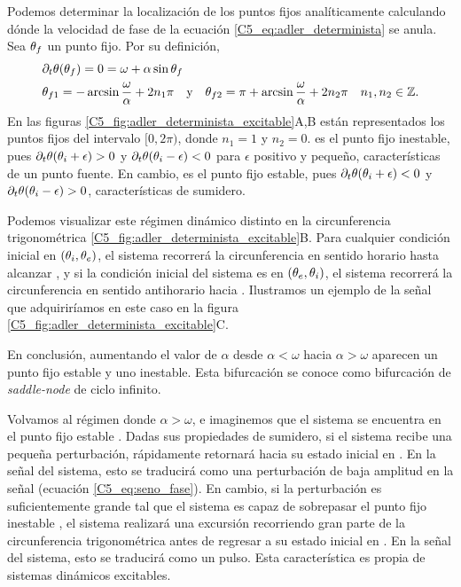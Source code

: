 \documentclass[./main.tex]{subfiles}
\begin{document}
Podemos determinar la localización de los puntos fijos analíticamente calculando dónde la velocidad de fase de la ecuación \ref{C5_eq:adler_determinista} se anula. Sea $\theta_f$ un punto fijo. Por su definición,  
\begin{align}
    &\partial_t \theta (\xx_f) = 0 = \omega + \alpha \sin{\xx_f}\\
    &\xx_{f1} = -\arcsin{\frac{\omega}{\alpha}} + 2 n_1 \pi \quad \text{y} \quad
     \xx_{f2} = \pi + \arcsin{\frac{\omega}{\alpha}} + 2 n_2  \pi \quad n_1,n_2 \in \mathbb{Z}.
    \label{C5_eq:PF_def}
\end{align}
En las figuras \ref{C5_fig:adler_determinista_excitable}A,B están representados los puntos fijos del intervalo $[0,2\pi)$, donde $n_1 = 1$ y $n_2 = 0$. \xxi es el punto fijo inestable, pues $\partial_t \theta (\theta_i+\epsilon) > 0$ y $\partial_t \theta (\theta_i-\epsilon) < 0$ para $\epsilon$ positivo y pequeño, características de un punto fuente. En cambio, \xxe es el punto fijo estable, pues $\partial_t \theta (\theta_i+\epsilon) < 0$ y $\partial_t \theta (\theta_i-\epsilon) > 0$, características de sumidero.


Podemos visualizar este régimen dinámico distinto en la circunferencia trigonométrica \ref{C5_fig:adler_determinista_excitable}B. Para cualquier condición inicial en $(\theta_i,\theta_e)$, el sistema recorrerá la circunferencia en sentido horario hasta alcanzar \xxe, y si la condición inicial del sistema es en $(\theta_e,\theta_i)$, el sistema recorrerá la circunferencia en sentido antihorario hacia \xxe. Ilustramos un ejemplo de la señal que adquiriríamos en este caso en la figura \ref{C5_fig:adler_determinista_excitable}C. 


En conclusión, aumentando el valor de $\alpha$ desde $\alpha < \omega$ hacia $\alpha > \omega$ aparecen un punto fijo estable y uno inestable. Esta bifurcación se conoce como bifurcación de \textit{saddle-node} de ciclo infinito. 


Volvamos al régimen donde $\alpha > \omega$, e imaginemos que el sistema se encuentra en el punto fijo estable \xxe. Dadas sus propiedades de sumidero, si el sistema recibe una pequeña perturbación, rápidamente retornará hacia su estado inicial en \xxe. En la señal  del sistema, esto se traducirá como una perturbación de baja amplitud en la señal (ecuación \ref{C5_eq:seno_fase}). En cambio, si la perturbación es suficientemente grande tal que el sistema es capaz de sobrepasar el punto fijo inestable \xxi, el sistema realizará una excursión recorriendo gran parte de la circunferencia trigonométrica antes de regresar a su estado inicial en \xxe. En la señal  del sistema, esto se traducirá como un pulso. Esta característica es propia de sistemas dinámicos excitables. 
\end{document}
